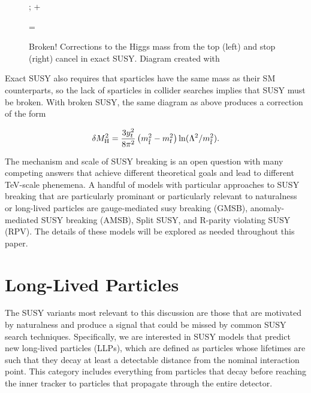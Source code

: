\documentclass[12pt]{article}
\begin{document}
    \noindent \begin{figure}[htbp] \begin{center}
        ;
    \quad + \quad
    \quad =  \quad
        \caption{Broken! Corrections to the Higgs mass from the top (left) and stop (right) cancel in exact SUSY. Diagram created with~\cite{tikz}}
    \label{exact_susy_correction}
    \end{center} \end{figure}

    Exact SUSY also requires that sparticles have the same mass as their SM counterparts, so the lack of sparticles in collider searches implies that SUSY must be broken. With broken SUSY, the same diagram as above produces a correction of the form~\cite{feng}  

    \noindent \begin{equation}
        \delta M_{\mathrm{H}}^2 = \frac{3y_t^2}{8\pi^2}\left(m_{\tilde{\mathrm{f}}}^2 - m_{\mathrm{f}}^2 \right)\ln(\Lambda^2/m_{\tilde{\mathrm{f}}}^2).
    \label{higgs_susy_correction}
    \end{equation}
    
    The mechanism and scale of SUSY breaking is an open question with many competing answers that achieve different theoretical goals and lead to different TeV-scale phenemena. A handful of models with particular approaches to SUSY breaking that are particularly prominant or particularly relevant to naturalness or long-lived particles are gauge-mediated susy breaking (GMSB), anomaly-mediated SUSY breaking (AMSB), Split SUSY, and R-parity violating SUSY (RPV). The details of these models will be explored as needed throughout this paper.

\section{Long-Lived Particles}
    The SUSY variants most relevant to this discussion are those that are motivated by naturalness and  produce a signal that could be missed by common SUSY search techniques. Specifically, we are interested in SUSY models that predict new long-lived particles (LLPs), which are defined as particles whose lifetimes are such that they decay at least a detectable distance from the nominal interaction point. This category includes everything from particles that decay before reaching the inner tracker to particles that propagate through the entire detector. 
\end{document}
